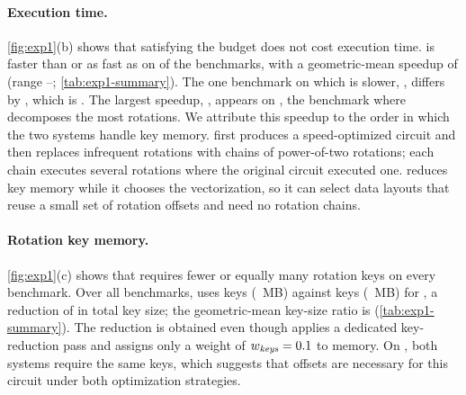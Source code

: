 \paragraph{Execution time.}
\cref{fig:exp1}(b) shows that satisfying the budget does not cost \cmorl{}
execution time. \cmorl{} is faster than or as fast as \baseline{} on
 of the  benchmarks, with a geometric-mean speedup of
\ex{$1.02\times$} (range \ex{$0.998\times$}--\ex{$1.063\times$};
\cref{tab:exp1-summary}). The one benchmark on which \cmorl{} is slower,
, differs by , which is
. The largest speedup, \ex{$1.063\times$}, appears on
, the benchmark where \rks{} decomposes the
most rotations.
We attribute this speedup to the order in which the two systems handle key
memory. \baseline{} first produces a speed-optimized circuit and then
replaces infrequent rotations with chains of power-of-two rotations; each
chain executes several rotations where the original circuit executed one.
\cmorl{} reduces key memory while it chooses the vectorization, so it can
select data layouts that reuse a small set of rotation offsets and need no
rotation chains.

\paragraph{Rotation key memory.}
\cref{fig:exp1}(c) shows that \cmorl{} requires fewer or equally many
rotation keys on every benchmark. Over all  benchmarks, \cmorl{}
uses  keys (~MB) against  keys (~MB) for
\baseline{}, a reduction of  in total key size; the
geometric-mean key-size ratio is  (\cref{tab:exp1-summary}). The
reduction is obtained even though \baseline{} applies a dedicated
key-reduction pass and \cmorl{} assigns only a weight of $w_{\mathit{keys}} = 0.1$ to
memory. On , both systems require the
same  keys, which suggests that  offsets are necessary for this
circuit under both optimization strategies.

